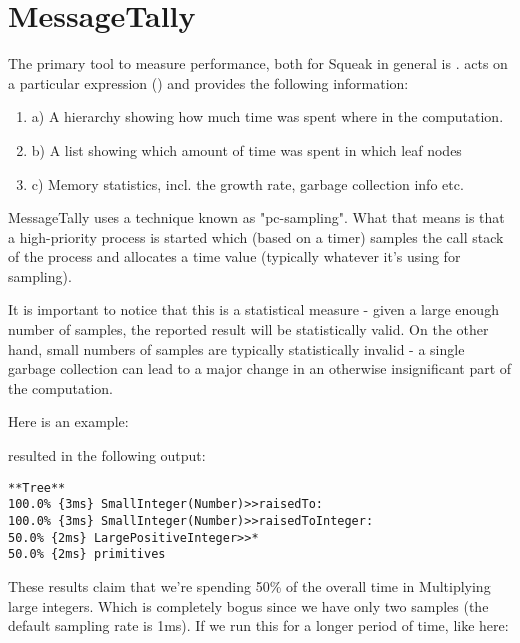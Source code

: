 \documentclass[a4paper,10pt,twoside]{book}
\begin{document}
\section{MessageTally}

The primary tool to measure performance, both for Squeak in general  is .  acts on a particular expression () and provides
the following information:

\begin{enumerate}
\item a) A hierarchy showing how much time was spent where in the computation.
\item b) A list showing which amount of time was spent in which leaf nodes
\item c) Memory statistics, incl. the growth rate, garbage collection info etc.
\end{enumerate}

MessageTally uses a technique known as "pc-sampling". What that means is
that a high-priority process is started which (based on a timer) samples
the call stack of the process and allocates a time value (typically
whatever it's using for sampling).

It is important to notice that this is a statistical measure - given a
large enough number of samples, the reported result will be
statistically valid. On the other hand, small numbers of samples are
typically statistically invalid - a single garbage collection can lead
to a major change in an otherwise insignificant part of the computation.

Here is an example:


resulted in the following output:

\begin{verbatim}
**Tree**
100.0% {3ms} SmallInteger(Number)>>raisedTo:
100.0% {3ms} SmallInteger(Number)>>raisedToInteger:
50.0% {2ms} LargePositiveInteger>>*
50.0% {2ms} primitives
\end{verbatim}

These results claim that we're spending 50\% of the overall time in
Multiplying large integers. Which is completely bogus since we have only
two samples (the default sampling rate is 1ms). If we run this for a
longer period of time, like here:

\end{document}
